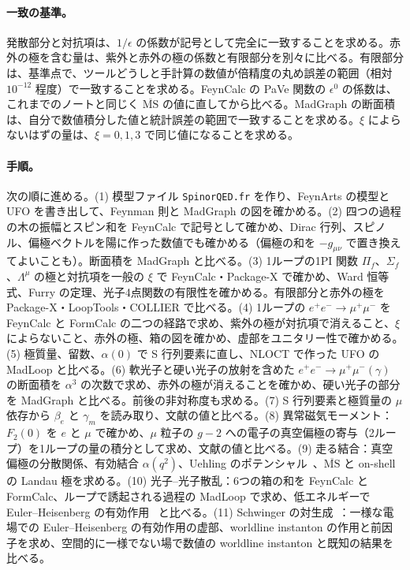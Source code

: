 \documentclass[a4paper,10pt]{ltjsarticle}
\newcommand{\MSbar}{\overline{\mathrm{MS}}}
\begin{document}
\paragraph{一致の基準。}発散部分と対抗項は、$1/\epsilon$ の係数が記号として完全に一致することを求める。赤外の極を含む量は、紫外と赤外の極の係数と有限部分を別々に比べる。有限部分は、基準点で、ツールどうしと手計算の数値が倍精度の丸め誤差の範囲（相対 $10^{-12}$ 程度）で一致することを求める。FeynCalc の PaVe 関数の $\epsilon^0$ の係数は、これまでのノートと同じく $\MSbar$ の値に直してから比べる。MadGraph の断面積は、自分で数値積分した値と統計誤差の範囲で一致することを求める。$\xi$ によらないはずの量は、$\xi=0,1,3$ で同じ値になることを求める。

\paragraph{手順。}次の順に進める。(1) 模型ファイル \texttt{SpinorQED.fr} を作り、FeynArts の模型と UFO を書き出して、Feynman 則と MadGraph の図を確かめる。(2) 四つの過程の木の振幅とスピン和を FeynCalc で記号として確かめ、Dirac 行列、スピノル、偏極ベクトルを陽に作った数値でも確かめる（偏極の和を $-g_{\mu\nu}$ で置き換えてよいことも）。断面積を MadGraph と比べる。(3) 1ループの1PI 関数 $\Pi_f$、$\Sigma_f$、$\Lambda^\mu$ の極と対抗項を一般の $\xi$ で FeynCalc・Package-X で確かめ、Ward 恒等式、Furry の定理、光子4点関数の有限性を確かめる。有限部分と赤外の極を Package-X・LoopTools・COLLIER で比べる。(4) 1ループの $e^+e^-\to\mu^+\mu^-$ を FeynCalc と FormCalc の二つの経路で求め、紫外の極が対抗項で消えること、$\xi$ によらないこと、赤外の極、箱の図を確かめ、虚部をユニタリー性で確かめる。(5) 極質量、留数、$\alpha(0)$ で S 行列要素に直し、NLOCT で作った UFO の MadLoop と比べる。(6) 軟光子と硬い光子の放射を含めた $e^+e^-\to\mu^+\mu^-(\gamma)$ の断面積を $\alpha^3$ の次数で求め、赤外の極が消えることを確かめ、硬い光子の部分を MadGraph と比べる。前後の非対称度も求める。(7) S 行列要素と極質量の $\mu$ 依存から $\beta_e$ と $\gamma_m$ を読み取り、文献の値と比べる。(8) 異常磁気モーメント：$F_2(0)$ を $e$ と $\mu$ で確かめ、$\mu$ 粒子の $g-2$ への電子の真空偏極の寄与（2ループ）を1ループの量の積分として求め、文献の値と比べる。(9) 走る結合：真空偏極の分散関係、有効結合 $\alpha(q^2)$、Uehling のポテンシャル~\cite{uehling}、$\MSbar$ と on-shell の Landau 極を求める。(10) 光子--光子散乱：6つの箱の和を FeynCalc と FormCalc、ループで誘起される過程の MadLoop で求め、低エネルギーで Euler--Heisenberg の有効作用~\cite{eh} と比べる。(11) Schwinger の対生成~\cite{schwinger51}：一様な電場での Euler--Heisenberg の有効作用の虚部、worldline instanton の作用と前因子を求め、空間的に一様でない場で数値の worldline instanton と既知の結果を比べる。
\end{document}
